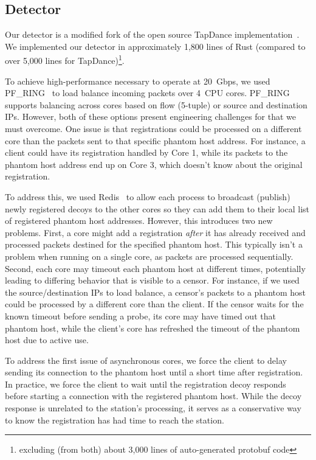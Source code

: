 \documentclass[sigconf]{acmart}
\begin{document}
\FigImplementation

\subsection{Detector}

Our detector is a modified fork of the open source TapDance
implementation~\cite{tapdance-source}.
We implemented our detector in approximately 1,800 lines of Rust (compared to
over 5,000 lines for TapDance)\footnote{excluding (from both) about 3,000 lines
of auto-generated protobuf code}.

To achieve high-performance necessary to operate at 20~Gbps, we used
PF\_RING~\cite{pfring} to load balance incoming packets over 4~CPU cores. PF\_RING
supports balancing across cores based on flow (5-tuple) or source and
destination IPs. However, both of these options present engineering challenges
for \scheme that we must overcome.
One issue is that registrations could be processed on a
different core than the packets sent to that specific phantom host address. For
instance, a client could have its registration handled by Core 1, while its
packets to the phantom host address end up on Core 3, which doesn't know about the
original registration.

To address this, we used Redis~\cite{redis} to allow each process to broadcast
(publish) newly registered decoys to the other cores so they can
add them to their local list of registered phantom host addresses.
However, this introduces two new problems. First, a core might add a
registration \emph{after} it has already received and processed packets destined
for the specified phantom host. This typically isn't a problem when running on a
single core, as packets are processed sequentially. Second, each core may
timeout each phantom host at different times, potentially leading to differing
behavior that is visible to a censor. For instance, if we used the
source/destination IPs to load balance, a censor's packets to a phantom host could
be processed by a different core than the client. If the censor waits for the
known timeout before sending a probe, its core may have timed out that phantom host, while the client's core has refreshed the timeout of the phantom host due
to active use.

To address the first issue of asynchronous cores, we force the client to delay sending its connection
to the phantom host until a short time after registration. In practice, we force
the client to wait until the registration decoy responds before starting a
connection with the registered phantom host. While the decoy response is
unrelated to the station's processing, it serves as a conservative way to know
the registration has had time to reach the station.
\end{document}
